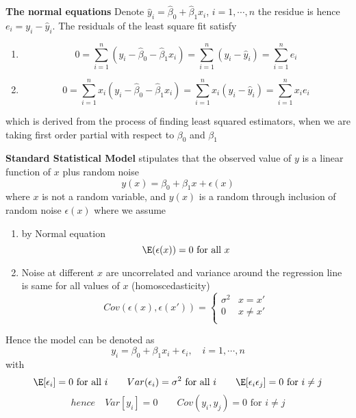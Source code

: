 \documentclass[11pt]{article}
\begin{document}
\begin{defn*}
  \textbf{The normal equations} Denote $\hat{y}_i = \hat{\beta}_0 + \hat{\beta}_1 x_i$, $i = 1, \cdots, n$ the residue is hence $e_i = y_i -\hat{y}_i$. The residuals of the least square fit satisfy
  \begin{enumerate}
    \item
    \[
      0 = \sum_{i=1}^n (y_i - \hat{\beta}_0 - \hat{\beta}_1 x_i) = \sum_{i=1}^n (y_i - \hat{y}_i) = \sum_{i=1}^n e_i
    \]
    \item
    \[
      0 = \sum_{i=1}^n x_i (y_i - \hat{\beta}_0 - \hat{\beta}_1 x_i) = \sum_{i=1}^n x_i (y_i - \hat{y}_i) = \sum_{i=1}^n x_i e_i
    \]
  \end{enumerate}
  which is derived from the process of finding least squared estimators, when we are taking first order partial with respect to $\beta_0$ and $\beta_1$
\end{defn*}

\begin{defn*}
  \textbf{Standard Statistical Model} stipulates that the observed value of $y$ is a linear function of $x$ plus random noise
  \[
    y(x) = \beta_0 + \beta_1 x + \epsilon(x)
  \]
  where $x$ is not a random variable, and $y(x)$ is a random through inclusion of random noise $\epsilon(x)$ where we assume
  \begin{enumerate}
    \item by Normal equation
    \[
      \E(\epsilon(x)) = 0 \text{ for all } x
    \]
    \item Noise at different $x$ are uncorrelated and variance around the regression line is same for all values of $x$ (homoscedasticity)
    \[
      Cov(\epsilon(x), \epsilon(x')) =
      \begin{cases}
        \sigma^2 & x = x' \\
        0 & x \neq x' \\
      \end{cases}
    \]
  \end{enumerate}
  Hence the model can be denoted as
  \[
    y_i = \beta_0 + \beta_1 x_i + \epsilon_i, \quad i = 1, \cdots, n
  \]
  with
  \[
    \E[\epsilon_i] = 0 \text{ for all } i  \quad \quad Var(\epsilon_i) = \sigma^2 \text{ for all } i \quad \quad \E[\epsilon_i \epsilon_j] = 0 \text{ for } i\neq j
  \]
  \[
    hence \quad Var[y_i] = 0 \quad \quad Cov(y_i, y_j) = 0 \text{ for } i\neq j
  \]
\end{defn*}
\end{document}
